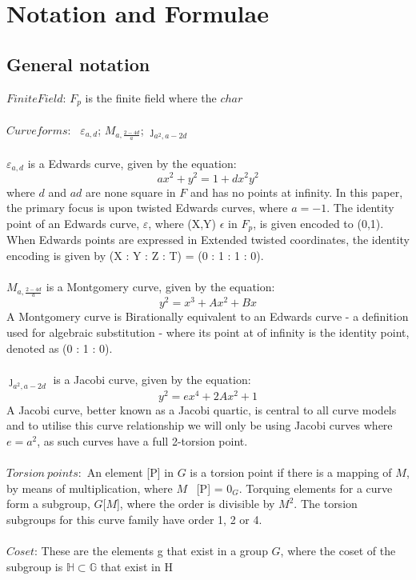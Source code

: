 \documentclass{article}
\begin{document}
\section{Notation and Formulae} 
\subsection{General notation}
$Finite Field$: $F_p$ is the finite field where the $char$ \\\\
$Curve forms$: \ $\varepsilon_{a,d}$; ${M}_{a,\frac{2-4d}{a}}$; $\jmath_{a^{2},a-{2d}}$\\\\
$\varepsilon_{a,d}$ is a Edwards curve, given by the equation: $$ {a}x^2+y^2=1+{d}x^2y^2 $$ where {$d$} and {$ad$} are none square in $F$ and has no points at infinity. In this paper, the primary focus is upon twisted Edwards curves, where $a = -1$. The identity point of an Edwards curve, $\varepsilon$, where (X,Y) $\epsilon$ in $F_p$, is given encoded to (0,1). When Edwards points are expressed in Extended twisted coordinates, the identity encoding is given by (X : Y : Z : T) = (0 : 1 : 1 : 0).\\\\
${M}_{a,\frac{2-4d}{a}}$ is a Montgomery curve, given by the equation: $$ y^2=x^3+Ax^2+Bx $$ A Montgomery curve is Birationally equivalent to an Edwards curve - a definition used for algebraic substitution -  where its point at of infinity is the identity point, denoted as (0 : 1 : 0).\\\\  
$\jmath_{a^{2},a−2d}$ is a Jacobi curve, given by the equation: $$y
^2 = {e}x^4 + 2Ax^2 + 1$$ A Jacobi curve, better known as a Jacobi quartic, is central to all curve models and to utilise this curve relationship we will only be using Jacobi curves where $e = {a}^2$, as such curves have a full 2-torsion point.\\\\
$Torsion\ points$:\ An element [P] in  $G$ is a torsion point if there is a mapping of $M$, by means of multiplication, where $M$ \textbullet\ [P] = $0_{G}$. Torquing elements for a curve form a subgroup, $G$[$M$], where the order is divisible by ${M}^2$. The torsion subgroups for this curve family have order 1, 2 or 4.  \\\\ $Coset$: These are the elements g that exist in a group $G$, where the coset of the subgroup is $\mathbb{H} \subset \mathbb{G}$ that exist in H
\end{document}
